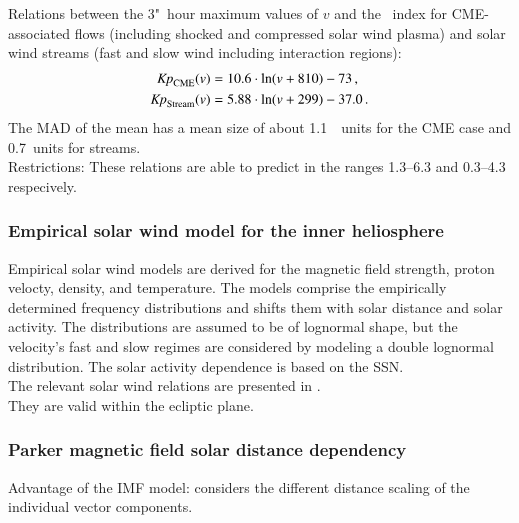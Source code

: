 Relations between the 3"~hour maximum values of $v$ and the \Kp~index for CME-associated flows (including shocked and compressed solar wind plasma) and solar wind streams (fast and slow wind including interaction regions):
\begin{align*}
	\text{\textit{Kp}}_\text{CME}(v) &= 10.6 \cdot \ln(v + 810) - 73	\,,\\
	\text{\textit{Kp}}_\text{Stream}(v) &= 5.88 \cdot \ln(v + 299) - 37.0	\,.
\end{align*}
The MAD of the mean has a mean size of about \SI{1.1}{\Kp~units} for the CME case and \SI{0.7}{\Kp}~units for streams.\\
Restrictions: These relations are able to predict \Kp{} in the ranges \numrange{1.3}{6.3} and \numrange{0.3}{4.3} respecively.\\


\subsubsection*{Empirical solar wind model for the inner heliosphere}

Empirical solar wind models are derived for the magnetic field strength, proton velocty, density, and temperature. The models comprise the empirically determined frequency distributions and shifts them with solar distance and solar activity. The distributions are assumed to be of lognormal shape, but the velocity's fast and slow regimes are considered by modeling a double lognormal distribution. The solar activity dependence is based on the SSN.\\

The relevant solar wind relations are presented in \citet[p.~10]{Venzmer2018}.\\
They are valid within the ecliptic plane.\\


\subsubsection*{Parker magnetic field solar distance dependency}
Advantage of the IMF model: considers the different distance scaling of the individual vector components.\\

